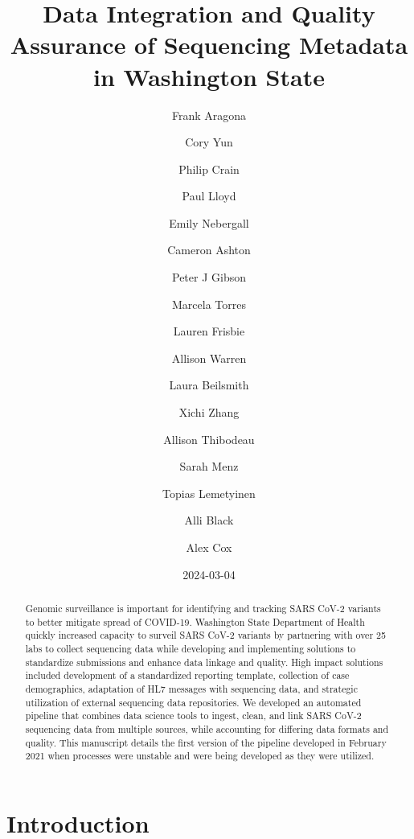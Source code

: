 \documentclass[
  letterpaper,
  DIV=11,
  numbers=noendperiod]{scrartcl}
\title{Data Integration and Quality Assurance of Sequencing Metadata in
Washington State}
\author{Frank Aragona \and Cory Yun \and Philip Crain \and Paul
Lloyd \and Emily Nebergall \and Cameron Ashton \and Peter J
Gibson \and Marcela Torres \and Lauren Frisbie \and Allison
Warren \and Laura Beilsmith \and Xichi Zhang \and Allison
Thibodeau \and Sarah Menz \and Topias Lemetyinen \and Alli
Black \and Alex Cox}
\date{2024-03-04}
\renewcommand*\contentsname{Table of contents}
\newcommand\contentsname{Table of contents}
\begin{document}
\maketitle
\begin{abstract}
Genomic surveillance is important for identifying and tracking SARS
CoV-2 variants to better mitigate spread of COVID-19. Washington State
Department of Health quickly increased capacity to surveil SARS CoV-2
variants by partnering with over 25 labs to collect sequencing data
while developing and implementing solutions to standardize submissions
and enhance data linkage and quality. High impact solutions included
development of a standardized reporting template, collection of case
demographics, adaptation of HL7 messages with sequencing data, and
strategic utilization of external sequencing data repositories. We
developed an automated pipeline that combines data science tools to
ingest, clean, and link SARS CoV-2 sequencing data from multiple
sources, while accounting for differing data formats and quality. This
manuscript details the first version of the pipeline developed in
February 2021 when processes were unstable and were being developed as
they were utilized.
\end{abstract}

\renewcommand*\contentsname{Table of contents}
{
\hypersetup{linkcolor=}
\setcounter{tocdepth}{3}
\tableofcontents
}
\section{Introduction}\label{introduction}
\end{document}
